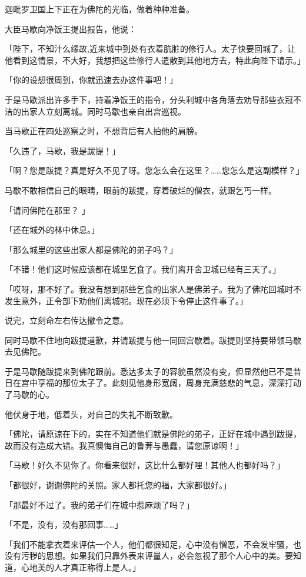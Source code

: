 \documentclass[twoside,openany]{book}
\begin{document}
迦毗罗卫国上下正在为佛陀的光临，做着种种准备。

大臣马歇向净饭王提出报告，他说：

「陛下，不知汁么缘故,近来城中到处有衣着肮脏的修行人。太子快要回城了，让他看到这情景，不大好，我想把这些修行人遣散到其他地方去，特此向陛下请示。」

「你的设想很周到，你就迅速去办这件事吧！」

于是马歇派出许多手下，持着净饭王的指令，分头利城中各角落去劝导那些衣冠不洁的出家人立刻离城。同时马歇也亲自出宫巡视。

当马歇正在四处巡察之时，不想背后有人拍他的肩膀。

「久违了，马歇，我是跋提！」

「啊？您是跋提？真是好久不见了呀。您怎么会在这里？……您怎么是这副模样？」

马歇不敢相信自己的眼睛，眼前的跋提，穿着破烂的僧衣，就跟乞丐一样。

「请问佛陀在那里？	」

「还在城外的林中休息。」

「那么城里的这些出家人都是佛陀的弟子吗？」

「不错！他们这时候应该都在城里乞食了。我们离开舍卫城已经有三天了。」

「哎呀，那不好了。我没有想到那些乞食的出家人是佛弟子。我为了佛陀回城时不发生意外，正令部下劝他们离城呢。现在必须下令停止这件事了。」

说完，立刻命左右传达撤令之意。

同时马歇不住地向跋提道歉，并请跋提与他一同回宫歇着。跋提则坚持要带领马歇去见佛陀。

于是马歇随跋提来到佛陀跟前。悉达多太子的容貌虽然没有变，但显然他已不是昔日在宫中享福的那位太子了。此刻见他身形宽阔，周身充满慈悲的气息，深深打动了马歇的心。

他伏身于地，低着头，对自己的失礼不断致歉。

「佛陀，请原谅在下的，实在不知道他们就是佛陀的弟子，正好在城中遇到跋提，故而没有造成大错。我真懊悔自己的鲁莾与愚蠢，请您原谅啊！」

「马歇！好久不见你了。你看来很好，这比什么都好哩！其他人也都好吗？」

「都很好，谢谢佛陀的关照。家人都托您的福，大家都很好。」

「那最好不过了。我的弟子们在城中惹麻烦了吗？」

「不是，没有，没有那回事……」

「我们不能拿衣着来评估一个人，他们都很知足，心中没有憎恶，不会发牢骚，也没有污秽的思想。如果我们只靠外表来评量人，必会忽视了那个人心中的美。要知道，心地美的人才真正称得上是人。」
\end{document}
